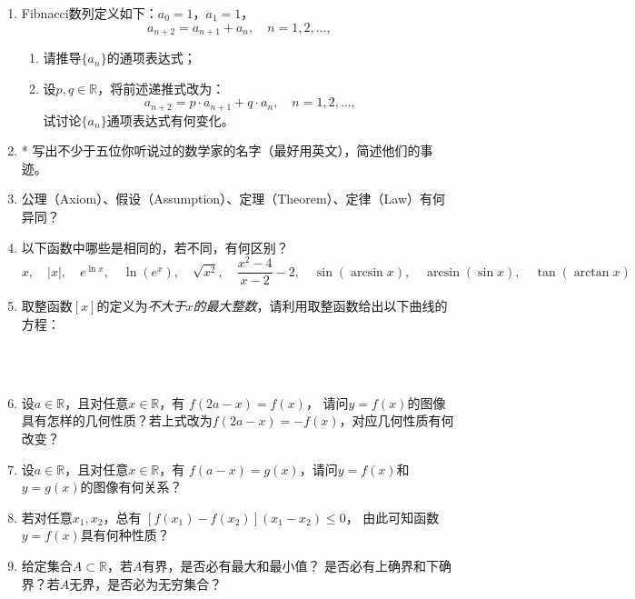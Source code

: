 \begin{enumerate}
  \item Fibnacci数列定义如下：$a_0=1$，$a_1=1$，
  $$a_{n+2}=a_{n+1}+a_{n},\quad n=1,2,\ldots,$$
  \begin{enumerate}[(1)]
    \item 请推导$\{a_n\}$的通项表达式；
    \item 设$p,q\in\mathbb{R}$，将前述递推式改为：
    $$a_{n+2}=p\cdot a_{n+1}+q\cdot a_{n},\quad n=1,2,\ldots,$$
    试讨论$\{a_n\}$通项表达式有何变化。
  \end{enumerate}
  \item* 写出不少于五位你听说过的数学家的名字（最好用英文），简述他们的事迹。
  \item 公理（Axiom）、假设（Assumption）、定理（Theorem）、定律（Law）有何异同？
  \item 以下函数中哪些是相同的，若不同，有何区别？
  $$x,\quad |x|,\quad e^{\ln x},\quad \ln(e^x),\quad \sqrt{x^2},\quad
	\frac{x^2-4}{x-2}-2,\quad
  \sin(\arcsin x),\quad \arcsin(\sin x), \quad \tan(\arctan x)$$
  \item 取整函数$[x]$的定义为{\it 不大于$x$的最大整数}，请利用取整函数给出以下曲线的方程：
  \begin{center}
	\\
	\\
  \end{center}
  \item 设$a\in\mathbb{R}$，且对任意$x\in\mathbb{R}$，有
  $f(2a-x)=f(x)$，
  请问$y=f(x)$的图像具有怎样的几何性质？若上式改为$f(2a-x)=-f(x)$，对应几何性质有何改变？
  \item 设$a\in\mathbb{R}$，且对任意$x\in\mathbb{R}$，有
  $f(a-x)=g(x)$，请问$y=f(x)$和$y=g(x)$的图像有何关系？
  \item 若对任意$x_1,x_2$，总有
  $[f(x_1)-f(x_2)](x_1-x_2)\leq 0$，
  由此可知函数$y=f(x)$具有何种性质？
  \item 给定集合$A\subset\mathbb{R}$，若$A$有界，是否必有最大和最小值？
  是否必有上确界和下确界？若$A$无界，是否必为无穷集合？
\end{enumerate}